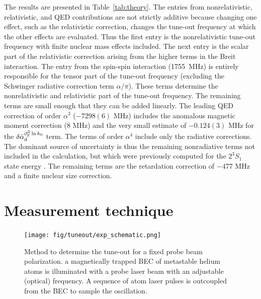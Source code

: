 	The results are presented in Table~\ref{tab:theory}. The entries from nonrelativistic, relativistic, and QED contributions are not strictly additive because changing one effect, such as the relativistic correction, changes the tune-out frequency at which the other effects are evaluated.  Thus the first entry is the nonrelativistic tune-out frequency with finite nuclear mass effects included.  The next entry is the scalar part of the relativistic correction arising from the higher terms in the Breit interaction.  The entry from the spin-spin interaction (1755~MHz) is entirely responsible for the tensor part of the tune-out frequency (excluding the Schwinger radiative correction term $\alpha/\pi$).  These terms determine the nonrelativistic and relativistic part of the tune-out frequency.  The remaining terms are small enough that they can be added linearly.  The leading QED correction of order $\alpha^3$ ($-7298(6)$ MHz) includes the anomalous magnetic moment correction (8 MHz) and the very small estimate of $-0.124(3)$ MHz for the $\delta\bar{\alpha}_{\rm d}^{\partial_{\cal E}^2\ln k_0}$ term.  The terms of order $\alpha^4$ include only the radiative corrections.  The dominant source of uncertainty is thus the remaining nonradiative terms not included in the calculation, but which were previously computed for the $2^3S_1$ state energy \cite{Pachucki06}.  The remaining terms are the retardation correction of $-477$ MHz and a finite nuclear size correction.



\section{Measurement technique}
	\label{sec:trap_freq_measure}


	\begin{figure}
	\begin{minipage}{0.5\textwidth}
	\vspace{0pt}
	\texttt{[image: fig/tuneout/exp\_schematic.png]}
	\end{minipage}
	\hfill
	\begin{minipage}{0.5\textwidth}
	\vspace{0pt}
	\caption{
	Method to determine the tune-out for a fixed probe beam polarization. a magnetically trapped BEC of metastable helium atoms is illuminated with a probe laser beam with an adjustable (optical) frequency. A sequence of atom laser pulses is outcoupled from the BEC to sample the oscillation. 
	}
	\label{fig:exp_schematic} 
	\end{minipage}
	\end{figure}


